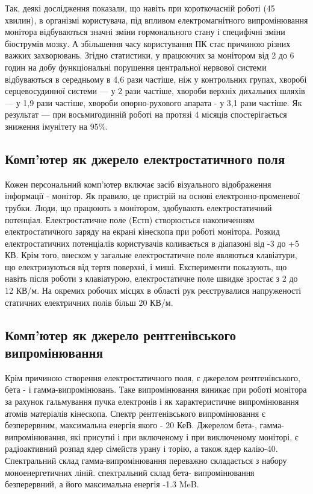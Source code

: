 Так, деякі дослідження показали, що навіть при короткочасній роботі (45 хвилин), в організмі користувача, 
під впливом електромагнітного випромінювання монітора відбуваються значні зміни гормонального стану і 
специфічні зміни біострумів мозку. А збільшення часу користування ПК стає причиною різних важких захворювань. 
Згідно статистики, у працюючих за монітором від 2 до 6 годин на добу функціональні порушення центральної 
нервової системи відбуваються в середньому в 4,6 рази частіше, ніж у контрольних групах, хворобі серцевосудинної 
системи --- у 2 рази частіше, хвороби верхніх дихальних шляхів --- у 1,9 рази частіше, хвороби опорно-рухового 
апарата - у 3,1 рази частіше. Як результат --- при восьмигодинній роботі на протязі 4 місяців спостерігається 
зниження імунітету на 95\%.


\subsection{Комп'ютер як джерело електростатичного поля}

Кожен персональний комп'ютер включає засіб візуального відображення інформації - монітор. Як правило, це 
пристрій на основі електронно-променевої трубки. Люди, що працюють з монітором, здобувають електростатичний 
потенціал. Електростатичне поле (Естп) створюється накопиченням електростатичного заряду на екрані кінескопа при 
роботі монітора. Розкид електростатичних потенціалів користувачів коливається в діапазоні від -3 до +5 КВ.
Крім того, внеском у загальне електростатичне поле являються клавіатури, що електризуються від тертя поверхні, і 
миші. Експерименти показують, що навіть після роботи з клавіатурою, електростатичне поле швидке зростає з 2 до 
12 КВ/м. На окремих робочих місцях в області рук реєструвалися напруженості статичних електричних полів більш 20 КВ/м.

\subsection{Комп'ютер як джерело рентгенівського випромінювання}

Крім причиною створення електростатичного поля, є джерелом рентгенівського, бета - і гамма-випромінювань. 
Таке випромінювання виникає при роботі монітора за рахунок гальмування пучка електронів і як характеристичне 
випромінювання атомів матеріалів кінескопа. Спектр рентгенівського випромінювання є безперервним, максимальна 
енергія якого - 20 КеВ. Джерелом бета-, гамма-випромінювання, які присутні і при включеному і при виключеному 
моніторі, є радіоактивний розпад ядер сімейств урану і торію, а також ядер калію-40. Спектральний склад гамма-випромінювання 
переважно складається з набору моноенергетичних ліній. спектральний склад бета- випромінювання безперервний, а його 
максимальна енергія -1.3 MeB. 

